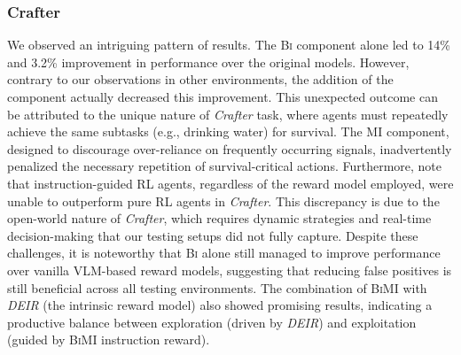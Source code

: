 \documentclass{article}
\theoremstyle{plain}
\theoremstyle{definition}
\theoremstyle{remark}
\begin{document}
\subsubsection{Crafter}
\label{subsec:main_results_crafter}
We observed an intriguing pattern of results. The \textsc{Bi} component alone led to 14\% and 3.2\% improvement in performance over the original models. However, contrary to our observations in other environments, the addition of the  component actually decreased this improvement. This unexpected outcome can be attributed to the unique nature of \emph{Crafter} task, where agents must repeatedly achieve the same subtasks (e.g., drinking water) for survival. The \textsc{MI} component,  designed to discourage over-reliance on frequently occurring signals, inadvertently penalized the necessary repetition of survival-critical actions. Furthermore, note that instruction-guided RL agents, regardless of the reward model employed, were unable to outperform pure RL agents in \emph{Crafter}. This discrepancy is due to the open-world nature of \emph{Crafter}, which requires dynamic strategies and real-time decision-making that our testing setups did not fully capture. Despite these challenges, it is noteworthy that \textsc{Bi} alone still managed to improve performance over vanilla VLM-based reward models, suggesting that reducing false positives is still beneficial across all testing environments. The combination of \textsc{BiMI} with \emph{DEIR} (the intrinsic reward model) also showed promising results, indicating a productive balance between exploration (driven by \emph{DEIR}) and exploitation (guided by \textsc{BiMI} instruction reward).
\end{document}
